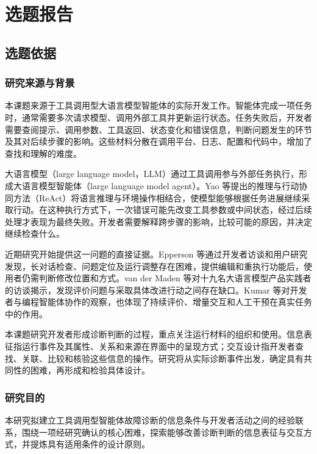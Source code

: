 \chapter{选题报告}\label{chap:selection-report}

\section{选题依据}

\subsection{研究来源与背景}

本课题来源于工具调用型大语言模型智能体的实际开发工作。智能体完成一项任务时，通常需要多次请求模型、调用外部工具并更新运行状态。任务失败后，开发者需要查阅提示、调用参数、工具返回、状态变化和错误信息，判断问题发生的环节及其对后续步骤的影响。这些材料分散在调用平台、日志、配置和代码中，增加了查找和理解的难度。

大语言模型（large language model，LLM）通过工具调用参与外部任务执行，形成大语言模型智能体（large language model agent）。Yao 等\cite{yao2023react}提出的推理与行动协同方法（ReAct）将语言推理与环境操作相结合，使模型能够根据任务进展继续采取行动。在这种执行方式下，一次错误可能先改变工具参数或中间状态，经过后续处理才表现为最终失败。开发者需要解释跨步骤的影响，比较可能的原因，并决定继续检查什么。

近期研究开始提供这一问题的直接证据。Epperson 等\cite{ref02}通过开发者访谈和用户研究发现，长对话检查、问题定位及运行调整存在困难，提供编辑和重执行功能后，使用者仍需判断修改位置和方式。van der Maden 等\cite{ref01}对十九名大语言模型产品实践者的访谈揭示，发现评价问题与采取具体改进行动之间存在缺口。Kumar 等\cite{ref59}对开发者与编程智能体协作的观察，也体现了持续评价、增量交互和人工干预在真实任务中的作用。

本课题研究开发者形成诊断判断的过程，重点关注运行材料的组织和使用。信息表征指运行事件及其属性、关系和来源在界面中的呈现方式；交互设计指开发者查找、关联、比较和核验这些信息的操作。研究将从实际诊断事件出发，确定具有共同性的困难，再形成和检验具体设计。

\subsection{研究目的}

本研究拟建立工具调用型智能体故障诊断的信息条件与开发者活动之间的经验联系，围绕一项经研究确认的核心困难，探索能够改善诊断判断的信息表征与交互方式，并提炼具有适用条件的设计原则。

